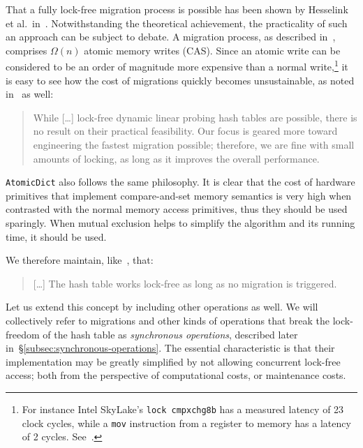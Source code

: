 That a fully lock-free migration process is possible has been shown by Hesselink et al.\ in~\cite[\S3.5]{hesselink}.
Notwithstanding the theoretical achievement, the practicality of such an approach can be subject to debate.
A migration process, as described in~\cite{hesselink}, comprises $\Omega(n)$ atomic memory writes (CAS).
Since an atomic write can be considered to be an order of magnitude more expensive than a normal write,\footnote{%
	For instance Intel SkyLake's \texttt{lock cmpxchg8b} has a measured latency of 23 clock cycles, while a \texttt{mov} instruction from a register to memory has a latency of 2 cycles.
	See~\cite[Intel Ice Lake and Tiger Lake]{x86-instruction-tables}.
} it is easy to see how the cost of migrations quickly becomes unsustainable, as noted in~\cite{maier} as well:

\begin{quote}
	While [\ldots] lock-free dynamic linear probing hash tables are possible, there is no result on their practical feasibility.
	Our focus is geared more toward engineering the fastest migration possible; therefore, we are fine with small amounts of locking, as long as it improves the overall performance.
\end{quote}

\texttt{AtomicDict} also follows the same philosophy.
It is clear that the cost of hardware primitives that implement compare-and-set memory semantics is very high when contrasted with the normal memory access primitives, thus they should be used sparingly.
When mutual exclusion helps to simplify the algorithm and its running time, it should be used.

We therefore maintain, like~\cite{maier}, that:

\begin{quote}
	[\ldots] The hash table works lock-free as long as no migration is triggered.
\end{quote}

Let us extend this concept by including other operations as well.
We will collectively refer to migrations and other kinds of operations that break the lock-freedom of the hash table as \emph{synchronous operations}, described later in~\S\ref{subsec:synchronous-operations}.
The essential characteristic is that their implementation may be greatly simplified by not allowing concurrent lock-free access; both from the perspective of computational costs, or maintenance costs.

